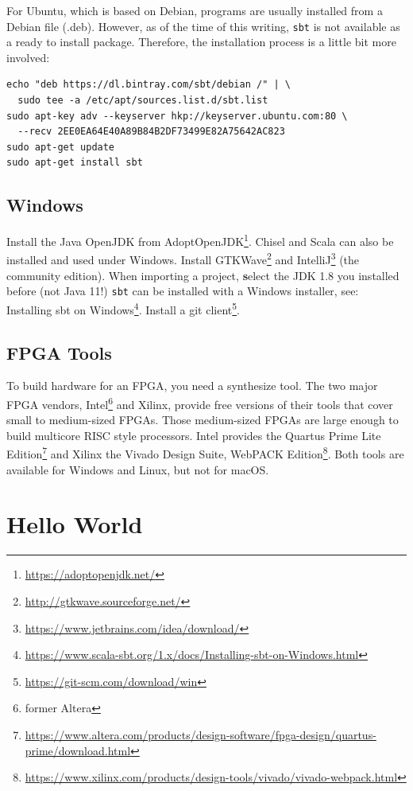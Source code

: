 \documentclass[%
    10pt,
    headinclude, footexclude,
    openright, %
    notitlepage,
    cleardoubleempty,
    headsepline,
    pointlessnumbers,
    bibtotoc, idxtotoc,
    ]{scrbook}
\newcommand{\code}[1]{{\small{\texttt{#1}}}}
\newcommand{\myref}[2]{\href{#1}{#2}}
\renewcommand{\myref}[2]{{#2}{\footnote{\url{#1}}}}
\begin{document}
For Ubuntu, which is based on Debian, programs are usually installed from a
Debian file (.deb). However, as of the time of this writing, \code{sbt} is not
available as a ready to install package. Therefore, the installation process
is a little bit more involved:
\begin{verbatim}
echo "deb https://dl.bintray.com/sbt/debian /" | \
  sudo tee -a /etc/apt/sources.list.d/sbt.list
sudo apt-key adv --keyserver hkp://keyserver.ubuntu.com:80 \
  --recv 2EE0EA64E40A89B84B2DF73499E82A75642AC823
sudo apt-get update
sudo apt-get install sbt
\end{verbatim}

\subsection{Windows}

Install the Java OpenJDK from \myref{https://adoptopenjdk.net/}{AdoptOpenJDK}.
Chisel and Scala can also be installed and used under Windows.
Install \myref{http://gtkwave.sourceforge.net/}{GTKWave} and
\myref{https://www.jetbrains.com/idea/download/}{IntelliJ} (the community edition).
When importing a project, {\textbf select the JDK 1.8} you installed before (not Java 11!)
\code{sbt} can be installed with a Windows installer, see:
\myref{https://www.scala-sbt.org/1.x/docs/Installing-sbt-on-Windows.html}{Installing sbt on Windows}.
Install a \myref{https://git-scm.com/download/win}{git client}.

\subsection{FPGA Tools}

To build hardware for an FPGA, you need a synthesize tool. The two major
FPGA vendors, Intel\footnote{former Altera} and Xilinx, provide free versions of
their tools that cover small to medium-sized FPGAs. Those medium-sized
FPGAs are large enough to build multicore RISC style processors.
Intel provides the \myref{https://www.altera.com/products/design-software/fpga-design/quartus-prime/download.html}{Quartus Prime Lite Edition} and Xilinx the
\myref{https://www.xilinx.com/products/design-tools/vivado/vivado-webpack.html}{Vivado Design Suite, WebPACK Edition}.
Both tools are available for Windows and Linux, but not for macOS.

\section{Hello World}
\end{document}
